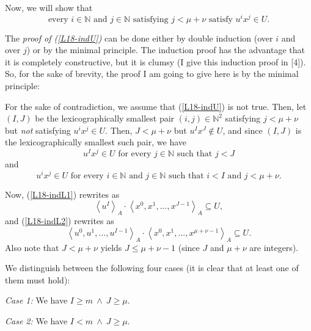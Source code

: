 \documentclass[12pt,final,notitlepage,onecolumn]{article}%
\begin{document}
Now, we will show that%
\begin{equation}
\text{every }i\in\mathbb{N}\text{ and }j\in\mathbb{N}\text{ satisfying }%
j<\mu+\nu\text{ satisfy }u^{i}x^{j}\in U. \label{L18-indU}%
\end{equation}


The \textit{proof of (\ref{L18-indU})} can be done either by double induction
(over $i$ and over $j$) or by the minimal principle. The induction proof has
the advantage that it is completely constructive, but it is clumsy (I give
this induction proof in [4]). So, for the sake of brevity, the proof I am
going to give here is by the minimal principle:

For the sake of contradiction, we assume that (\ref{L18-indU}) is not true.
Then, let $\left(  I,J\right)  $ be the lexicographically smallest pair
$\left(  i,j\right)  \in\mathbb{N}^{2}$ satisfying $j<\mu+\nu$ but
\textit{not} satisfying $u^{i}x^{j}\in U$. Then, $J<\mu+\nu$ but $u^{I}%
x^{J}\notin U$, and since $\left(  I,J\right)  $ is the lexicographically
smallest such pair, we have%
\begin{equation}
u^{I}x^{j}\in U\text{ for every }j\in\mathbb{N}\text{ such that }j<J
\label{L18-indL1}%
\end{equation}
and%
\begin{equation}
u^{i}x^{j}\in U\text{ for every }i\in\mathbb{N}\text{ and }j\in\mathbb{N}%
\text{ such that }i<I\text{ and }j<\mu+\nu. \label{L18-indL2}%
\end{equation}


Now, (\ref{L18-indL1}) rewrites as%
\begin{equation}
\left\langle u^{I}\right\rangle _{A}\cdot\left\langle x^{0},x^{1}%
,...,x^{J-1}\right\rangle _{A}\subseteq U, \label{L18-indL1final}%
\end{equation}
and (\ref{L18-indL2}) rewrites as
\begin{equation}
\left\langle u^{0},u^{1},...,u^{I-1}\right\rangle _{A}\cdot\left\langle
x^{0},x^{1},...,x^{\mu+\nu-1}\right\rangle _{A}\subseteq U.
\label{L18-indL2final}%
\end{equation}
Also note that $J<\mu+\nu$ yields $J\leq\mu+\nu-1$ (since $J$ and $\mu+\nu$
are integers).

We distinguish between the following four cases (it is clear that at least one
of them must hold):

\textit{Case 1:} We have $I\geq m\ \wedge\ J\geq\mu$.

\textit{Case 2:} We have $I<m\ \wedge\ J\geq\mu$.
\end{document}
